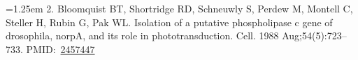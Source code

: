 \documentclass[letterpaper,oneside,11pt]{book}
\begin{document}
\hangindent=1.25em 
\hypertarget{ref-Bloomquist1988}{}
2. Bloomquist BT, Shortridge RD, Schneuwly S, Perdew M, Montell C, Steller H, Rubin G, Pak WL. Isolation of a putative phospholipase c gene of drosophila, norpA, and its role in phototransduction. Cell. 1988 Aug;54(5):723–733. PMID: \href{http://www.ncbi.nlm.nih.gov/pubmed/2457447}{2457447}

\end{document}
